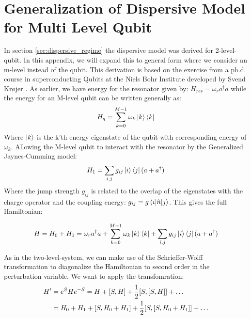 \chapter{Generalization of Dispersive Model for Multi Level Qubit}\label{appendix:multiqubit}
In section \ref{sec:dispersive_regime} the dispersive model was derived for 2-level-qubit. In this appendix, we will expand this to general form where we consider an m-level instead of the qubit. This derivation is based on the exercise from a ph.d. course in superconducting Qubits at the Niels Bohr Institute developed by Svend Krøjer \cite{kroejer_week_2023}. As earlier, we have energy for the resonator given by: $H_{res} = \omega_r a^\dagger a$ while the energy for an M-level qubit can be written generally as:
\begin{equation}
    H_{q} = \sum_{k = 0}^{M-1} \omega_k \ket{k}\bra{k}
\end{equation}
Where $\ket{k}$ is the k'th energy eigenstate of the qubit with corresponding energy of $\omega_k$. Allowing the M-level qubit to interact with the resonator by the Generalized Jaynes-Cumming model:
\begin{equation}
    H_1 =  \sum_{i,j} g_{ij} \ket{i}\bra{j} (a + a^\dagger ) 
\end{equation}
Where the jump strength $g_{ij}$ is related to the overlap of the eigenstates with the charge operator and the coupling energy: $g_{ij} = g \matrixel{i}{\hat{n}}{j}$. This gives the full Hamiltonian: 
\begin{fullwidth}
    \begin{equation}
        H = H_0 + H_1  = \omega_r a^\dagger a +  \sum_{k = 0}^{M-1} \omega_k \ket{k}\bra{k} + \sum_{i,j} g_{ij} \ket{i}\bra{j} (a + a^\dagger ) 
    \end{equation}
\end{fullwidth}
As in the two-level-system, we can make  use of the Schrieffer-Wolff transformation to diagonalize the Hamiltonian to second order in the perturbation variable. We want to apply the transfomration:
\begin{align}
    H' &= e^{S} H e^{-S} = H + \comm{S}{H} + \frac{1}{2}\comm{S}{\comm{S}{H}} + \dots \nonumber\\
                        &= H_0 + H_1 + \comm{S}{H_0 + H_1} + \frac{1}{2} \comm{S}{\comm{S}{H_0 + H_1}} + \dots
\end{align}
